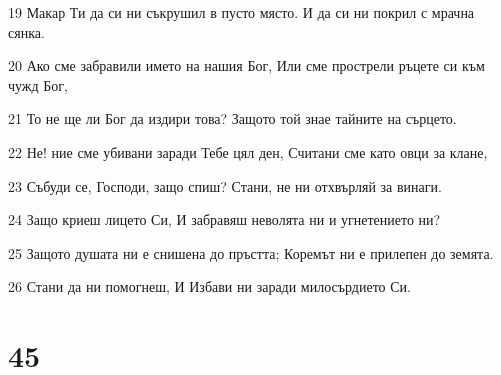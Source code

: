 \par 19 Макар Ти да си ни съкрушил в пусто място. И да си ни покрил с мрачна сянка.
\par 20 Ако сме забравили името на нашия Бог, Или сме прострели ръцете си към чужд Бог,
\par 21 То не ще ли Бог да издири това? Защото той знае тайните на сърцето.
\par 22 Не! ние сме убивани заради Тебе цял ден, Считани сме като овци за клане,
\par 23 Събуди се, Господи, защо спиш? Стани, не ни отхвърляй за винаги.
\par 24 Защо криеш лицето Си, И забравяш неволята ни и угнетението ни?
\par 25 Защото душата ни е снишена до пръстта; Коремът ни е прилепен до земята.
\par 26 Стани да ни помогнеш, И Избави ни заради милосърдието Си.

\chapter{45}

